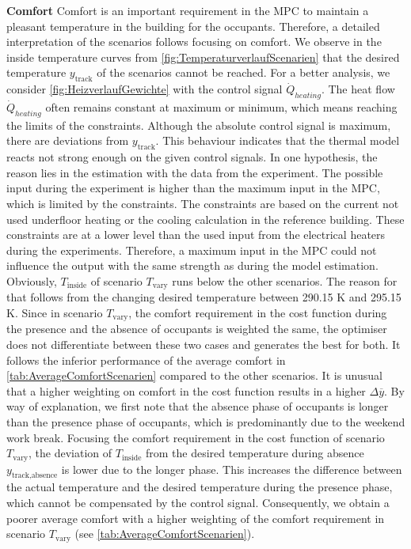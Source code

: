 \textbf{Comfort}\newline
Comfort is an important requirement in the MPC to maintain a pleasant temperature in the building for the occupants. Therefore, a detailed interpretation of the scenarios follows focusing on comfort.\newline
We observe in the inside temperature curves from \autoref{fig:TemperaturverlaufScenarien} that the desired temperature $y_\text{track}$ of the scenarios cannot be reached. For a better analysis, we consider \autoref{fig:HeizverlaufGewichte} with the control signal $\dot{Q}_{heating}$. The heat flow $\dot{Q}_{heating}$ often remains constant at maximum or minimum, which means reaching the limits of the constraints. Although the absolute control signal is maximum, there are deviations from $y_\text{track}$. This behaviour indicates that the thermal model reacts not strong enough on the given control signals. In one hypothesis, the reason lies in the estimation with the data from the experiment. The possible input during the experiment is higher than the maximum input in the MPC, which is limited by the constraints. The constraints are based on the current not used underfloor heating or the cooling calculation in the reference building. These constraints are at a lower level than the used input from the electrical heaters during the experiments. Therefore, a maximum input in the MPC could not influence the output with the same strength as during the model estimation. \newline
Obviously, $T_\text{inside}$ of scenario $T_\text{vary}$ runs below the other scenarios. The reason for that follows from the changing desired temperature between 290.15 K and 295.15 K. Since in scenario $T_\text{vary}$, the comfort requirement in the cost function during the presence and the absence of occupants is weighted the same, the optimiser does not differentiate between these two cases and generates the best for both. It follows the inferior performance of the average comfort in \autoref{tab:AverageComfortScenarien} compared to the other scenarios. It is unusual that a higher weighting on comfort in the cost function results in a higher $\Delta \overline{y}$. By way of explanation, we first note that the absence phase of occupants is longer than the presence phase of occupants, which is predominantly due to the weekend work break. Focusing the comfort requirement in the cost function of scenario $T_\text{vary}$, the deviation of $T_\text{inside}$ from the desired temperature during absence $y_\text{track,absence}$ is lower due to the longer phase. This increases the difference between the actual temperature and the desired temperature during the presence phase, which cannot be compensated by the control signal. Consequently, we obtain a poorer average comfort with a higher weighting of the comfort requirement in scenario $T_\text{vary}$ (see \autoref{tab:AverageComfortScenarien}).\newline 
